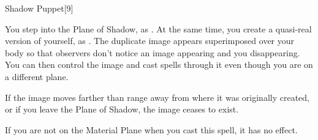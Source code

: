 \begin{spellsection}{Shadow Puppet}[9]
    \begin{spellheader}
    \end{spellheader}
    \begin{spellcontent}
        \spelleffect You step into the Plane of Shadow, as . At the same time, you create a quasi-real version of yourself, as . The duplicate image appears superimposed over your body so that observers don't notice an image appearing and you disappearing. You can then control the image and cast spells through it even though you are on a different plane.
        \spelldur \durshort
    \end{spellcontent}
    \begin{spellfooter}
        \spellnotes If the image moves farther than \rnglong range away from where it was originally created, or if you leave the Plane of Shadow, the image ceases to exist.

        If you are not on the Material Plane when you cast this spell, it has no effect.
        \miscastexplode
    \end{spellfooter}
\end{spellsection}

